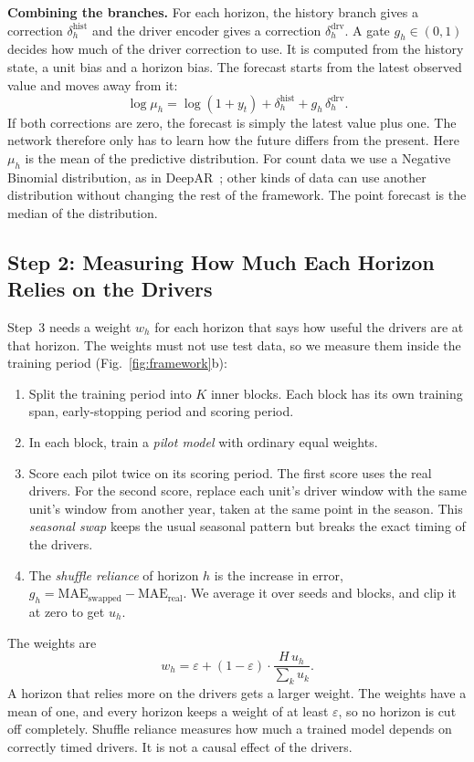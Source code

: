 \documentclass[conference]{IEEEtran}
\begin{document}
\textbf{Combining the branches.} For each horizon, the history branch gives a correction $\delta^{\mathrm{hist}}_h$ and the driver encoder gives a correction $\delta^{\mathrm{drv}}_h$. A gate $g_h \in (0,1)$ decides how much of the driver correction to use. It is computed from the history state, a unit bias and a horizon bias. The forecast starts from the latest observed value and moves away from it:
\begin{equation}
\log \mu_h = \log(1+y_t) + \delta^{\mathrm{hist}}_h + g_h\,\delta^{\mathrm{drv}}_h . \label{eq:mean}
\end{equation}
If both corrections are zero, the forecast is simply the latest value plus one. The network therefore only has to learn how the future differs from the present. Here $\mu_h$ is the mean of the predictive distribution. For count data we use a Negative Binomial distribution, as in DeepAR~\cite{salinas2020deepar}; other kinds of data can use another distribution without changing the rest of the framework. The point forecast is the median of the distribution.

\subsection{Step 2: Measuring How Much Each Horizon Relies on the Drivers}

Step~3 needs a weight $w_h$ for each horizon that says how useful the drivers are at that horizon. The weights must not use test data, so we measure them inside the training period (Fig.~\ref{fig:framework}b):
\begin{enumerate}
\item Split the training period into $K$ inner blocks. Each block has its own training span, early-stopping period and scoring period.
\item In each block, train a \emph{pilot model} with ordinary equal weights.
\item Score each pilot twice on its scoring period. The first score uses the real drivers. For the second score, replace each unit's driver window with the same unit's window from another year, taken at the same point in the season. This \emph{seasonal swap} keeps the usual seasonal pattern but breaks the exact timing of the drivers.
\item The \emph{shuffle reliance} of horizon $h$ is the increase in error, $g_h = \mathrm{MAE}_{\mathrm{swapped}} - \mathrm{MAE}_{\mathrm{real}}$. We average it over seeds and blocks, and clip it at zero to get $u_h$.
\end{enumerate}
The weights are
\begin{equation}
w_h = \varepsilon + (1-\varepsilon) \cdot \frac{H\,u_h}{\sum_k u_k}. \label{eq:weights}
\end{equation}
A horizon that relies more on the drivers gets a larger weight. The weights have a mean of one, and every horizon keeps a weight of at least $\varepsilon$, so no horizon is cut off completely. Shuffle reliance measures how much a trained model depends on correctly timed drivers. It is not a causal effect of the drivers.
\end{document}
